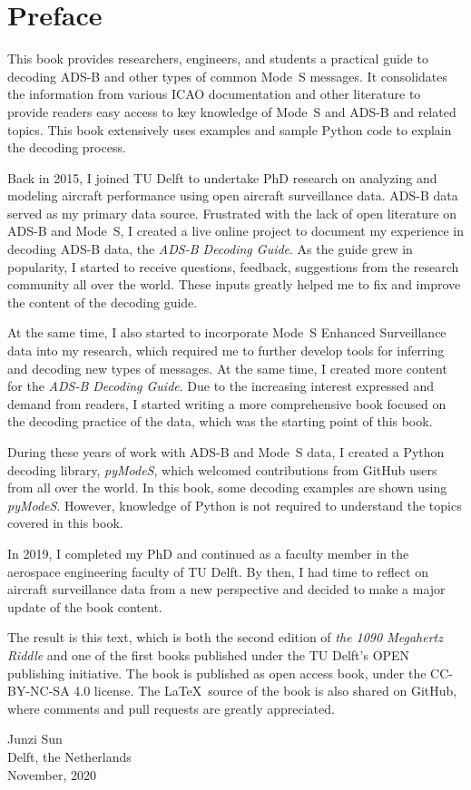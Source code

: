 \chapter*{Preface}

\vspace{-0.3cm}

{
This book provides researchers, engineers, and students a practical guide to decoding ADS-B and other types of common Mode~S messages. It consolidates the information from various ICAO documentation and other literature to provide readers easy access to key knowledge of Mode~S and ADS-B and related topics. This book extensively uses examples and sample Python code to explain the decoding process.

Back in 2015, I joined TU Delft to undertake PhD research on analyzing and modeling aircraft performance using open aircraft surveillance data. ADS-B data served as my primary data source. Frustrated with the lack of open literature on ADS-B and Mode~S, I created a live online project to document my experience in decoding ADS-B data, the \emph{ADS-B Decoding Guide}. As the guide grew in popularity, I started to receive questions, feedback, suggestions from the research community all over the world. These inputs greatly helped me to fix and improve the content of the decoding guide.

At the same time, I also started to incorporate Mode~S Enhanced Surveillance data into my research, which required me to further develop tools for inferring and decoding new types of messages. At the same time, I created more content for the \emph{ADS-B Decoding Guide}. Due to the increasing interest expressed and demand from readers, I started writing a more comprehensive book focused on the decoding practice of the data, which was the starting point of this book.

During these years of work with ADS-B and Mode~S data, I created a Python decoding library, \emph{pyModeS}, which welcomed contributions from GitHub users from all over the world. In this book, some decoding examples are shown using \emph{pyModeS}. However, knowledge of Python is not required to understand the topics covered in this book.

In 2019, I completed my PhD and continued as a faculty member in the aerospace engineering faculty of TU Delft. By then, I had time to reflect on aircraft surveillance data from a new perspective and decided to make a major update of the book content.

The result is this text, which is both the second edition of \emph{the 1090 Megahertz Riddle} and one of the first books published under the TU Delft's OPEN publishing initiative. The book is published as open access book, under the CC-BY-NC-SA 4.0 license. The \LaTeX~source of the book is also shared on GitHub, where comments and pull requests are greatly appreciated.

\vspace{0.4cm}

\begin{flushright}
  Junzi Sun \\
  Delft, the Netherlands \\
  November, 2020
\end{flushright}
}